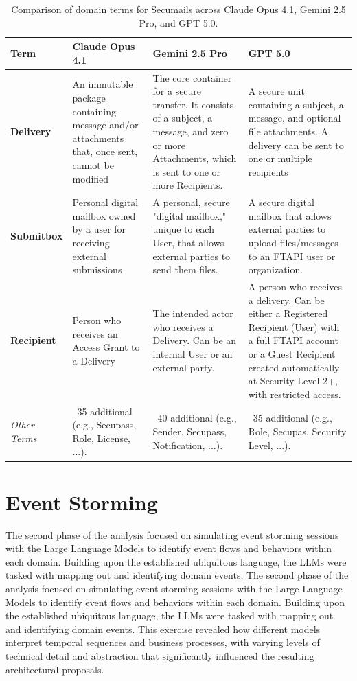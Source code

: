 \begin{table}[htbp]
    \centering
    \begin{tabular}{|p{2.5cm}|p{4cm}|p{4cm}|p{4cm}|}
    \hline
    \rowcolor{gray!20}
    \textbf{Term} & \textbf{Claude Opus 4.1} & \textbf{Gemini 2.5 Pro} & \textbf{GPT 5.0} \\
    \hline
    \textbf{Delivery} & 
    An immutable package containing message and/or attachments that, once sent, cannot be modified &
    The core container for a secure transfer. It consists of a subject, a message, and zero or more Attachments, which is sent to one or more Recipients. &
    A secure unit containing a subject, a message, and optional file attachments. A delivery can be sent to one or multiple recipients \\
    \hline
    \textbf{Submitbox} & 
    Personal digital mailbox owned by a user for receiving external submissions&
    A personal, secure "digital mailbox," unique to each User, that allows external parties to send them files. &
    A secure digital mailbox that allows external parties to upload files/messages to an FTAPI user or organization. \\
    \hline
    \textbf{Recipient} & 
    Person who receives an Access Grant to a Delivery &
    The intended actor who receives a Delivery. Can be an internal User or an external party. &
    A person who receives a delivery. Can be either a Registered Recipient (User) with a full FTAPI account or a Guest Recipient created automatically at Security Level 2+, with restricted access. \\
    \hline
    \rowcolor{gray!10}
    \textit{Other Terms} & 
    ~35 additional (e.g., Secupass, Role, License, ...). &
    ~40 additional (e.g., Sender, Secupass, Notification, ...). &
    ~35 additional (e.g., Role, Secupas, Security Level, ...). \\
    \hline
    \end{tabular}
    \caption{Comparison of domain terms for Secumails across Claude Opus 4.1, Gemini 2.5 Pro, and GPT 5.0.}
    \label{tab:secumails-ubiquitous-language}
\end{table}

\section{Event Storming}
The second phase of the analysis focused on simulating event storming sessions with the Large Language Models to identify event flows and behaviors within each domain. Building upon the established ubiquitous language, the LLMs were tasked with mapping out and identifying domain events. The second phase of the analysis focused on simulating event storming sessions with the Large Language Models to identify event flows and behaviors within each domain. Building upon the established ubiquitous language, the LLMs were tasked with mapping out and identifying domain events. This exercise revealed how different models interpret temporal sequences and business processes, with varying levels of technical detail and abstraction that significantly influenced the resulting architectural proposals.

